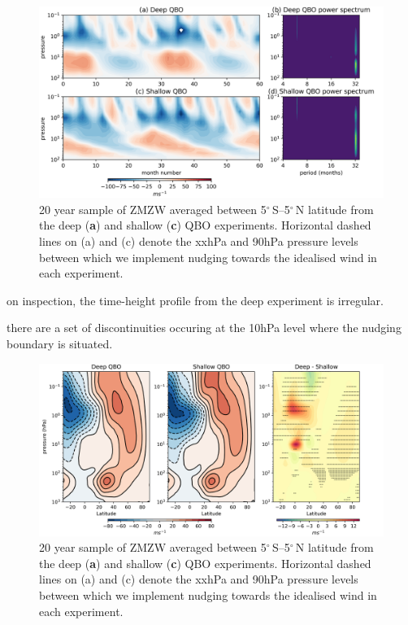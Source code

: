 \begin{figure}[h!]
\begin{center}
\noindent\includegraphics[width = \linewidth]{Figures/Figures-deepQBO/experiment_QBOs.png}
\caption[Equatorial ZMZW time-height profiles from QBO nudging experiments]{20 year sample of ZMZW averaged between 5$^{\circ}$\,S--5$^{\circ}$\,N latitude from the deep (\textbf{a}) and shallow (\textbf{c}) QBO experiments. Horizontal dashed lines on (a) and (c) denote the xxhPa and 90hPa pressure levels between which we implement nudging towards the idealised wind in each experiment.}
\label{fig:experiment_QBOs}
\end{center}
\end{figure}


on inspection, the time-height profile from the deep experiment is irregular. 

there are a set of discontinuities occuring at the 10hPa level where the nudging boundary is situated.

\begin{figure}[h!]
\begin{center}
\noindent\includegraphics[width = \linewidth]{Figures/Figures-deepQBO/DJF_climatologies.png}
\caption[Equatorial ZMZW time-height profiles from QBO nudging experiments]{20 year sample of ZMZW averaged between 5$^{\circ}$\,S--5$^{\circ}$\,N latitude from the deep (\textbf{a}) and shallow (\textbf{c}) QBO experiments. Horizontal dashed lines on (a) and (c) denote the xxhPa and 90hPa pressure levels between which we implement nudging towards the idealised wind in each experiment.}
\label{fig:climatologies_experiments}
\end{center}
\end{figure}


